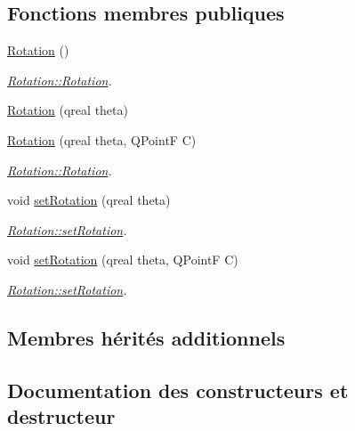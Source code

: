 \subsection*{Fonctions membres publiques}
\begin{DoxyCompactItemize}
\item 
\hyperlink{class_rotation_a13ea1d345ca0a92c0f09b4de544ca460}{Rotation} ()
\begin{DoxyCompactList}\small\item\em \hyperlink{class_rotation_a13ea1d345ca0a92c0f09b4de544ca460}{Rotation\+::\+Rotation}. \end{DoxyCompactList}\item 
\hyperlink{class_rotation_a4939b65ee4d8cc83269eb668fc6aed40}{Rotation} (qreal theta)
\item 
\hyperlink{class_rotation_abfceda7f8e104a03351262fdf4c5356d}{Rotation} (qreal theta, Q\+Point\+F C)
\begin{DoxyCompactList}\small\item\em \hyperlink{class_rotation_a13ea1d345ca0a92c0f09b4de544ca460}{Rotation\+::\+Rotation}. \end{DoxyCompactList}\item 
void \hyperlink{class_rotation_ae4e808253ede637d1894f769778cd3cb}{set\+Rotation} (qreal theta)
\begin{DoxyCompactList}\small\item\em \hyperlink{class_rotation_ae4e808253ede637d1894f769778cd3cb}{Rotation\+::set\+Rotation}. \end{DoxyCompactList}\item 
void \hyperlink{class_rotation_aab9fbeda6f4a74f01d2418d232fbce44}{set\+Rotation} (qreal theta, Q\+Point\+F C)
\begin{DoxyCompactList}\small\item\em \hyperlink{class_rotation_ae4e808253ede637d1894f769778cd3cb}{Rotation\+::set\+Rotation}. \end{DoxyCompactList}\end{DoxyCompactItemize}
\subsection*{Membres hérités additionnels}


\subsection{Documentation des constructeurs et destructeur}
\hypertarget{class_rotation_a13ea1d345ca0a92c0f09b4de544ca460}{}
